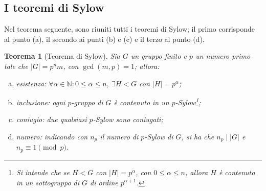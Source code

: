 \documentclass[11pt]{article}
\theoremstyle{style}
\newtheorem{teorema}{Teorema}[section]
\numberwithin{equation}{subsection}
\begin{document}
\subsection{I teoremi di Sylow}
Nel teorema seguente, sono riuniti tutti i teoremi di Sylow; il primo corrisponde al punto (a), il secondo ai punti (b) e (c) e il terzo al punto (d).
\begin{teorema}
	[Teorema di Sylow]
	Sia $G$ un gruppo finito e $p$ un numero primo tale che $\lvert G \rvert =p^n m$, con $\operatorname{gcd}(m,p) =1$; allora:
	\begin{enumerate}[(a).]
		\item \textit{esistenza}: $\forall \alpha \in \mathbb{N} : 0\le \alpha \le n, \ \exists H < G$ con $\lvert H \rvert = p^\alpha $;
		\item \textit{inclusione}: ogni $p$-gruppo di $G$ \`e contenuto in un $p$-Sylow\footnote{Si intende che se $H < G$ con $\lvert H \rvert = p^\alpha $, con $0\le \alpha\le n $, allora $H$ \`e contenuto in un sottogruppo di $G$ di ordine $p^{\alpha  + 1} $.};
		\item \textit{coniugio}: due qualsiasi $p$-Sylow sono coniugati;
		\item \textit{numero}: indicando con $n_p$ il numero di $p$-Sylow di $G$, si ha che $n_p  \mid |G|$ e $n_p \equiv 1 \pmod{p} $.
	\end{enumerate}
\end{teorema}
\end{document}
